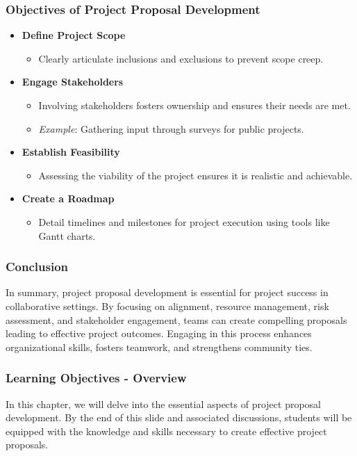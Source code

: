 \documentclass[aspectratio=169]{beamer}
\begin{document}
\begin{frame}[fragile]
    \frametitle{Objectives of Project Proposal Development}
    \begin{itemize}
        \item \textbf{Define Project Scope}
            \begin{itemize}
                \item Clearly articulate inclusions and exclusions to prevent scope creep.
            \end{itemize}

        \item \textbf{Engage Stakeholders}
            \begin{itemize}
                \item Involving stakeholders fosters ownership and ensures their needs are met.
                \item \textit{Example}: Gathering input through surveys for public projects.
            \end{itemize}

        \item \textbf{Establish Feasibility}
            \begin{itemize}
                \item Assessing the viability of the project ensures it is realistic and achievable.
            \end{itemize}

        \item \textbf{Create a Roadmap}
            \begin{itemize}
                \item Detail timelines and milestones for project execution using tools like Gantt charts.
            \end{itemize}
    \end{itemize}
\end{frame}

\begin{frame}[fragile]
    \frametitle{Conclusion}
    In summary, project proposal development is essential for project success in collaborative settings. 
    By focusing on alignment, resource management, risk assessment, and stakeholder engagement, teams can create compelling proposals leading to effective project outcomes. 
    Engaging in this process enhances organizational skills, fosters teamwork, and strengthens community ties.
\end{frame}

\begin{frame}[fragile]
    \frametitle{Learning Objectives - Overview}
    In this chapter, we will delve into the essential aspects of project proposal development. By the end of this slide and associated discussions, students will be equipped with the knowledge and skills necessary to create effective project proposals.
\end{frame}
\end{document}
